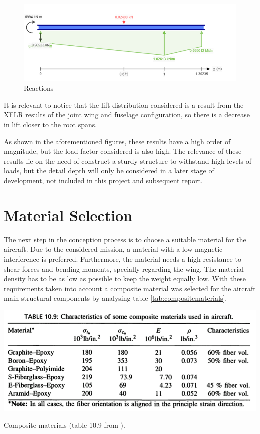 \documentclass[english,fira]{ist-report}
\begin{document}
\begin{figure}[!ht]
    \centering
    \includegraphics[width = 0.9\linewidth]{graphics/reactions.png}
    \caption{Reactions}
    \label{fig:Reactions}
\end{figure}

It is relevant to notice that the lift distribution considered is a result from the XFLR results of the joint wing and fuselage configuration, so there is a decrease in lift closer to the root spans.

As shown in the aforementioned figures, these results have a high order of magnitude, but the load factor considered is also high. The relevance of these results lie on the need of construct a sturdy structure to withstand high levels of loads, but the detail depth will only be considered in a later stage of development, not included in this project and subsequent report.

\section{Material Selection}

The next step in the conception process is to choose a suitable material for the aircraft. Due to the considered mission, a material with a low magnetic interference is preferred. Furthermore, the material needs a high resistance to shear forces and bending moments, specially regarding the wing. The material density has to be as low as possible to keep the weight equally low. With these requirements taken into account a composite material was selected for the aircraft main structural components by analysing table \ref{tab:compositematerials}.
\begin{table}[!ht]
    \centering
    \includegraphics[width = 0.9\linewidth, trim = {0 3mm 0 15mm}, clip]{graphics/Propriedades_Material.png}
    \caption{Composite materials (table 10.9 from  \cite{corke}).}
    \label{tab:compositematerials}
\end{table}
\end{document}
